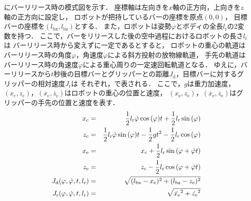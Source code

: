           \figref{}にバーリリース時の模式図を示す．
          座標軸は左向きを$x$軸の正方向，上向きを$z$軸の正方向に設定し，
          ロボットが把持しているバーの座標を原点$(0,0)$，
          目標バーの座標を$(l_{\mathrm{bx}},l_{\mathrm{bz}})$とする．
          また，ロボットは姿勢$\varphi$とボディの全長$l_{\mathrm{r}}$の2変数を持つ．
          ここで，バーをリリースした後の空中過程におけるロボットの長さ$l_{\mathrm{r}}$は
          バーリリース時から変えずに一定であるとすると， 
          ロボットの重心の軌道はバーリリース時の角度$\varphi$，角速度$\dot{\varphi}$による斜方投射の放物線軌道，
          手先の軌道はバーリリース時の角速度$\dot{\varphi}$による重心周りの一定速回転軌道となる．
          ゆえに，バーリリースから$t$秒後の目標バーとグリッパーとの距離$J_{\mathrm{d}}$，目標バーに対するグリッパーの相対速度$J_{\mathrm{r}}$は
          それぞれ，で表される．
          ここで，$g$は重力加速度，$(x_{\mathrm{c}},z_{\mathrm{c}})$，$(\dot{x_{\mathrm{c}}},\dot{z_{\mathrm{c}}})$はロボットの重心の位置と速度，
          $(x_{\mathrm{e}},z_{\mathrm{e}})$，$(\dot{x_{\mathrm{e}}},\dot{z_{\mathrm{e}}})$はグリッパーの手先の位置と速度を表す．
          \begin{eqnarray}
            \equlabel{x-c}
            x_{\mathrm{c}}&=&\frac{1}{2}l_{\mathrm{r}}\dot{\varphi}\cos{(\varphi)}t+\frac{1}{2}l_{\mathrm{r}}\sin{(\varphi)}\\
            \equlabel{z-c}
            z_{\mathrm{c}}&=&\frac{1}{2}l_{\mathrm{r}}\dot{\varphi}\sin{(\varphi)}t-\frac{1}{2}gt^2-\frac{1}{2}l_{\mathrm{r}}\cos{(\varphi)}\\
            \equlabel{x-e}
            x_{\mathrm{e}}&=&x_{\mathrm{c}}+\frac{1}{2}l_{\mathrm{r}}\sin{(\varphi+\dot{\varphi}t)}\\
            \equlabel{z-e}
            z_{\mathrm{e}}&=&z_{\mathrm{c}}-\frac{1}{2}l_{\mathrm{r}}\cos{(\varphi+\dot{\varphi}t)}\\
            \equlabel{Jd}
              J_{\mathrm{d}}(\varphi,\dot{\varphi},t,l_{\mathrm{r}})
              &=&\sqrt{(l_{\mathrm{bx}}-x_{\mathrm{e}})^2+(l_{\mathrm{bz}}-z_{\mathrm{e}})^2}\\
            \equlabel{Jr}
            J_{\mathrm{r}}(\varphi,\dot{\varphi},t,l_{\mathrm{r}})
            &=&\sqrt{\dot{x_{\mathrm{e}}}^2+\dot{z_{\mathrm{e}}}^2}
          \end{eqnarray}  
    
